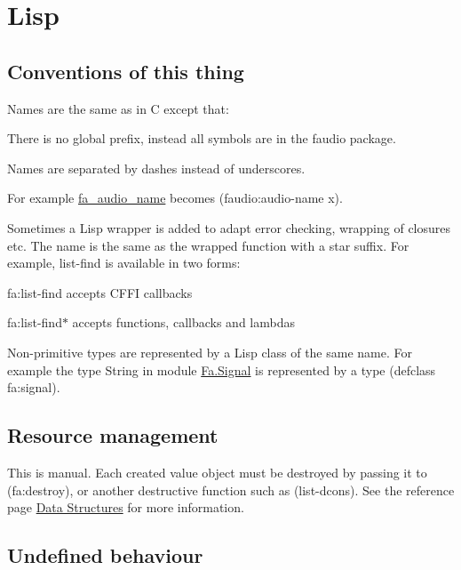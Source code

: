 \hypertarget{md__languages_Lisp}{}\section{Lisp}\label{md__languages_Lisp}
\hypertarget{md__languages_Conventionsofthisthing}{}\subsection{Conventions of this thing}\label{md__languages_Conventionsofthisthing}
Names are the same as in C except that\-:


\begin{DoxyItemize}
\item There is no global prefix, instead all symbols are in the {\ttfamily faudio} package.
\item Names are separated by dashes instead of underscores.
\end{DoxyItemize}

For example \hyperlink{group___fa_audio_device_ga8e04c8feea7e664d2c7de9c9e57a5f4e}{fa\-\_\-audio\-\_\-name} becomes {\ttfamily (faudio\-:audio-\/name x)}.

Sometimes a Lisp wrapper is added to adapt error checking, wrapping of closures etc. The name is the same as the wrapped function with a star suffix. For example, {\ttfamily list-\/find} is available in two forms\-:


\begin{DoxyItemize}
\item {\ttfamily fa\-:list-\/find} accepts C\-F\-F\-I callbacks
\item {\ttfamily fa\-:list-\/find$\ast$} accepts functions, callbacks and lambdas
\end{DoxyItemize}

Non-\/primitive types are represented by a Lisp class of the same name. For example the type String in module \hyperlink{group___fa_signal}{Fa.Signal} is represented by a type {\ttfamily (defclass fa\-:signal)}.\hypertarget{md__languages_Resourcemanagement}{}\subsection{Resource management}\label{md__languages_Resourcemanagement}
This is manual. Each created value object must be destroyed by passing it to {\ttfamily (fa\-:destroy)}, or another destructive function such as {\ttfamily (list-\/dcons)}. See the reference page \hyperlink{md__data_structures_DataStructures}{Data Structures} for more information.\hypertarget{md__languages_Undefinedbehaviour}{}\subsection{Undefined behaviour}\label{md__languages_Undefinedbehaviour}

